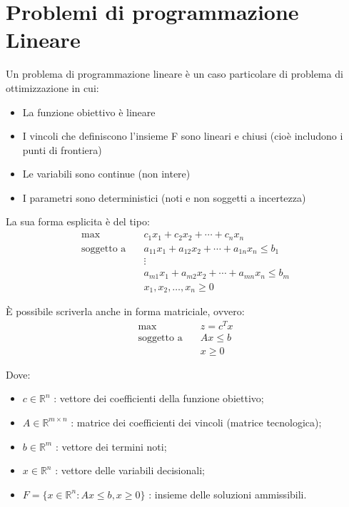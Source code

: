 \section{Problemi di programmazione Lineare}
Un problema di programmazione lineare è un caso particolare di problema di ottimizzazione in cui:
\begin{itemize}
    \item La funzione obiettivo è lineare
    \item I vincoli che definiscono l'insieme F sono lineari e chiusi (cioè includono i punti di frontiera)
    \item Le variabili sono continue (non intere)
    \item I parametri sono deterministici (noti e non soggetti a incertezza)
\end{itemize}

La sua forma esplicita è del tipo:
\begin{align}
\max & \quad c_1x_1 + c_2x_2 + \cdots + c_nx_n \\
\text{soggetto a} & \quad a_{11}x_1 + a_{12}x_2 + \cdots + a_{1n}x_n \leq b_1 \\
& \quad \vdots \\
& \quad a_{m1}x_1 + a_{m2}x_2 + \cdots + a_{mn}x_n \leq b_m \\
& \quad x_1, x_2, \ldots, x_n \geq 0
\end{align}

È possibile scriverla anche in forma matriciale, ovvero:
\begin{align}
\max & \quad z = c^T x \\
\text{soggetto a} & \quad Ax \leq b \\
& \quad x \geq 0
\end{align}

Dove:
\begin{itemize}
    \item $c \in \mathbb{R}^n$ : vettore dei coefficienti della funzione obiettivo;
    \item $A \in \mathbb{R}^{m \times n}$ : matrice dei coefficienti dei vincoli (matrice tecnologica);
    \item $b \in \mathbb{R}^m$ : vettore dei termini noti;
    \item $x \in \mathbb{R}^n$ : vettore delle variabili decisionali;
    \item $F = \{x \in \mathbb{R}^n : Ax \leq b, x \geq 0\}$ : insieme delle soluzioni ammissibili.
\end{itemize}

